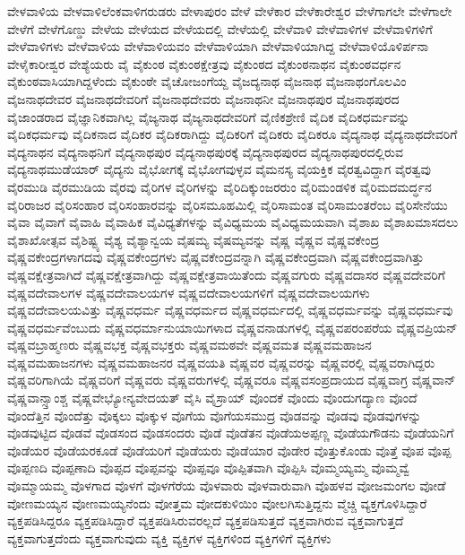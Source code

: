 {ವೇಳವಾಳಿಯ
ವೇಳವಾಳಿಲೆಂಕವಾಳಿಗರುಡರು
ವೇಳಾಪುರಂ
ವೇಳೆ
ವೇಳೆಕಾರ
ವೇಳೆಕಾರೇಶ್ವರ
ವೇಳೆಗಾಗಲೇ
ವೇಳೆಗಾಲೇ
ವೇಳೆಗೆ
ವೇಳೆಗೊಣ್ಡು
ವೇಳೆಯ
ವೇಳೆಯದ
ವೇಳೆಯದಲ್ಲಿ
ವೇಳೆಯಲ್ಲಿ
ವೇಳೆವಾಳಿ
ವೇಳೆವಾಳಿಗಳ
ವೇಳೆವಾಳಿಗಳಿಗೆ
ವೇಳೆವಾಳಿಗಳು
ವೇಳೆವಾಳಿಯ
ವೇಳೆವಾಳಿಯವಂ
ವೇಳೆವಾಳಿಯಾಗಿ
ವೇಳೆವಾಳಿಯಾಗಿದ್ದ
ವೇಳೆವಾಳಿಯೊಳಿರ್ಪನಾ
ವೇಳೈಕಾರೀಶ್ವರ
ವೇಶ್ಯೆಯರು
ವೈ
ವೈಕುಂಠ
ವೈಕುಂಠಕ್ಷೇತ್ರವು
ವೈಕುಂಠದ
ವೈಕುಂಠನಾಥನ
ವೈಕುಂಠವರ್ಧನ
ವೈಕುಂಠವಾಸಿಯಾಗಿದ್ದಳೆಂದು
ವೈಕುಂಠೇ
ವೈಚೋಜಂಗೆಯ್ದ
ವೈಜದ್ಯನಾಥ
ವೈಜನಾಥ
ವೈಜನಾಥಂಗೊಲವಿಂ
ವೈಜನಾಥದೇವರ
ವೈಜನಾಥದೇವರಿಗೆ
ವೈಜನಾಥದೇವರು
ವೈಜನಾಥನೀ
ವೈಜನಾಥಪುರ
ವೈಜನಾಥಪುರದ
ವೈಜಾಂಡರಾದ
ವೈಜ್ಞಾನಿಕವಾಗಿಲ್ಲ
ವೈಜ್ಯನಾಥ
ವೈಜ್ಯನಾಥದೇವರಿಗೆ
ವೈಣಿಕಶ್ರೇಣಿ
ವೈದಿಕ
ವೈದಿಕಧರ್ಮವನ್ನು
ವೈದಿಕಧರ್ಮವು
ವೈದಿಕನಾದ
ವೈದಿಕರ
ವೈದಿಕರಾಗಿದ್ದು
ವೈದಿಕರಿಗೆ
ವೈದಿಕರು
ವೈದಿಕರೂ
ವೈದ್ಯನಾಥ
ವೈದ್ಯನಾಥದೇವರಿಗೆ
ವೈದ್ಯನಾಥನ
ವೈದ್ಯನಾಥನಿಗೆ
ವೈದ್ಯನಾಥಪುರ
ವೈದ್ಯನಾಥಪುರಕ್ಕೆ
ವೈದ್ಯನಾಥಪುರದ
ವೈದ್ಯನಾಥಪುರದಲ್ಲಿರುವ
ವೈದ್ಯನಾಥಮುಡೆಯಾರ್
ವೈದ್ಯನು
ವೈಭೋಗಕ್ಕೆ
ವೈಭೋಗವುಳ್ಳವ
ವೈಮನಸ್ಯ
ವೈಯಕ್ತಿಕ
ವೈರತ್ವವಿದ್ದಾಗ
ವೈರತ್ವವು
ವೈರಮುಡಿ
ವೈರಮುಡಿಯ
ವೈರವು
ವೈರಿಗಳ
ವೈರಿಗಳನ್ನು
ವೈರಿದಿಕ್ಕುಂಜರರುಂ
ವೈರಿಮಂಡಳಿಕ
ವೈರಿಮದಮರ್ದ್ಧನ
ವೈರಿರಾಜರ
ವೈರಿಸಂಹಾರ
ವೈರಿಸಂಹಾರವನ್ನು
ವೈರಿಸಮೂಹಮಿಲ್ಲಿ
ವೈರಿಸಾಮಂತ
ವೈರಿಸಾಮಂತರೆಂಬ
ವೈರಿಸೇನೆಯು
ವೈವಾ
ವೈವಾಗೆ
ವೈವಾಹಿ
ವೈವಾಹಿಕ
ವೈವಿಧ್ಯತೆಗಳನ್ನು
ವೈವಿಧ್ಯಮಯ
ವೈವಿಧ್ಯಮಯವಾಗಿ
ವೈಶಾಖ
ವೈಶಾಖಮಾಸದಲು
ವೈಶಾಖೋತ್ಸವ
ವೈಶಿಷ್ಟ್ಯ
ವೈಶ್ಯ
ವೈಶ್ಯಾನ್ವಯ
ವೈಷಮ್ಯ
ವೈಷಮ್ಯವನ್ನು
ವೈಷ್ಣ
ವೈಷ್ಣವ
ವೈಷ್ಣವಕೇಂದ್ರ
ವೈಷ್ಣವಕೇಂದ್ರಗಳಾಗದವು
ವೈಷ್ಣವಕೇಂದ್ರಗಳು
ವೈಷ್ಣವಕೇಂದ್ರವನ್ನಾಗಿ
ವೈಷ್ಣವಕೇಂದ್ರವಾಗಿ
ವೈಷ್ಣವಕೇಂದ್ರವಾಗಿತ್ತು
ವೈಷ್ಣವಕ್ಷೇತ್ರವಾಗಿದೆ
ವೈಷ್ಣವಕ್ಷೇತ್ರವಾಗಿದ್ದು
ವೈಷ್ಣವಕ್ಷೇತ್ರವಾಯಿತೆಂದು
ವೈಷ್ಣವಗುರು
ವೈಷ್ಣವದಾಸರ
ವೈಷ್ಣವದೇವರಿಗೆ
ವೈಷ್ಣವದೇವಾಲಗಳ
ವೈಷ್ಣವದೇವಾಲಯಗಳ
ವೈಷ್ಣವದೇವಾಲಯಗಳಿಗೆ
ವೈಷ್ಣವದೇವಾಲಯಗಳು
ವೈಷ್ಣವದೇವಾಲಯವಿತ್ತು
ವೈಷ್ಣವಧರ್ಮ
ವೈಷ್ಣವಧರ್ಮದ
ವೈಷ್ಣವಧರ್ಮದಲ್ಲಿ
ವೈಷ್ಣವಧರ್ಮವನ್ನು
ವೈಷ್ಣವಧರ್ಮವು
ವೈಷ್ಣವಧರ್ಮವೆಂಬುದು
ವೈಷ್ಣವಧರ್ಮಾನುಯಾಯಿಗಳಾದ
ವೈಷ್ಣವನಾಡುಗಳಲ್ಲಿ
ವೈಷ್ಣವಪರಂಪರೆಯ
ವೈಷ್ಣವಪ್ರಿಯನ್
ವೈಷ್ಣವಬ್ರಾಹ್ಮಣರು
ವೈಷ್ಣವಭಕ್ತ
ವೈಷ್ಣವಭಕ್ತರು
ವೈಷ್ಣವಮಠವೇ
ವೈಷ್ಣವಮತ
ವೈಷ್ಣವಮಹಾಜನ
ವೈಷ್ಣವಮಹಾಜನಗಳು
ವೈಷ್ಣವಮಹಾಜನರ
ವೈಷ್ಣವಯತಿ
ವೈಷ್ಣವರ
ವೈಷ್ಣವರನ್ನು
ವೈಷ್ಣವರಲ್ಲಿ
ವೈಷ್ಣವರಾಗಿದ್ದರು
ವೈಷ್ಣವರಿಗಾಗಿಯೆ
ವೈಷ್ಣವರಿಗೆ
ವೈಷ್ಣವರು
ವೈಷ್ಣವರುಗಳಲ್ಲಿ
ವೈಷ್ಣವರೂ
ವೈಷ್ಣವಸಂಪ್ರದಾಯದ
ವೈಷ್ಣವಾಗ್ರ
ವೈಷ್ಣವಾನ್
ವೈಷ್ಣವಾನ್ಸ್ತಾಂಶ್ಚ
ವೈಷ್ಣವೇಭ್ಯೋನ್ಯವೇದಯತ್
ವೈಸಿ
ವೈಸ್ರಾಯ್
ವೊಂದಕೆ
ವೊಂದು
ವೊಂದುಗದ್ಯಾಣ
ವೊಂದೆ
ವೊಂದೆತ್ತಿನ
ವೊಂದೆತ್ತು
ವೊಕ್ಕಲು
ವೊಕ್ಕುಳ
ವೊಗೆಯ
ವೊಗೆಯಸಮುದ್ರ
ವೊಡವನ್ನು
ವೊಡವು
ವೊಡವುಗಳನ್ನು
ವೊಡವುಟ್ಟಿದ
ವೊಡವೆ
ವೊಡಸಂದ
ವೊಡಸಂದರು
ವೊಡೆ
ವೊಡೆತನ
ವೊಡೆಯಅಪ್ಪಣ್ಣ
ವೊಡೆಯಗೌಡನು
ವೊಡೆಯನಿಗೆ
ವೊಡೆಯರ
ವೊಡೆಯರಕೂಡೆ
ವೊಡೆಯರಿಗೆ
ವೊಡೆಯರು
ವೊಡೆಯಾರ
ವೊಡೇರ
ವೊತ್ತುಕೊಂಡು
ವೊತ್ತೆ
ವೊಪ
ವೊಪ್ಪ
ವೊಪ್ಪಣದಿ
ವೊಪ್ಪಣಾದಿ
ವೊಪ್ಪದ
ವೊಪ್ಪವನ್ನು
ವೊಪ್ಪವೂ
ವೊಪ್ಪಿತವಾಗಿ
ವೊಪ್ಪಿಸಿ
ವೊಮ್ಮಯ್ಯಮ್ಮ
ವೊಮ್ಮವ್ವೆ
ವೊಮ್ಮಾಯಮ್ಮ
ವೊಳಗಾದ
ವೊಳಗೆ
ವೊಳಗೆರೆಯ
ವೊಳವಾರು
ವೊಳವಾರುವಾಗಿ
ವೊಹಳವ
ವೋಜಮಂಗಲ
ವೋಡೆ
ವೋಣಮಯ್ಯನ
ವೋಣಮಯ್ಯನೆಂದು
ವೋತ್ತಮ
ವೋದಕುಳಿಯಿಂ
ವೋಲಗಿಸುತ್ತಿದ್ದನು
ವ್ಮೆಚ್ಚಿ
ವ್ಯಕ್ತಗೊಳಿಸಿದ್ದಾರೆ
ವ್ಯಕ್ತಪಡಿಸಿದ್ದರೂ
ವ್ಯಕ್ತಪಡಿಸಿದ್ದಾರೆ
ವ್ಯಕ್ತಪಡಿಸಿರುವರಲ್ಲದೆ
ವ್ಯಕ್ತಪಡಿಸುತ್ತದೆ
ವ್ಯಕ್ತವಾಗಿರುವ
ವ್ಯಕ್ತವಾಗುತ್ತದೆ
ವ್ಯಕ್ತವಾಗುತ್ತದೆಂದು
ವ್ಯಕ್ತವಾಗುವುದು
ವ್ಯಕ್ತಿ
ವ್ಯಕ್ತಿಗಳ
ವ್ಯಕ್ತಿಗಳಿಂದ
ವ್ಯಕ್ತಿಗಳಿಗೆ
ವ್ಯಕ್ತಿಗಳು
}
